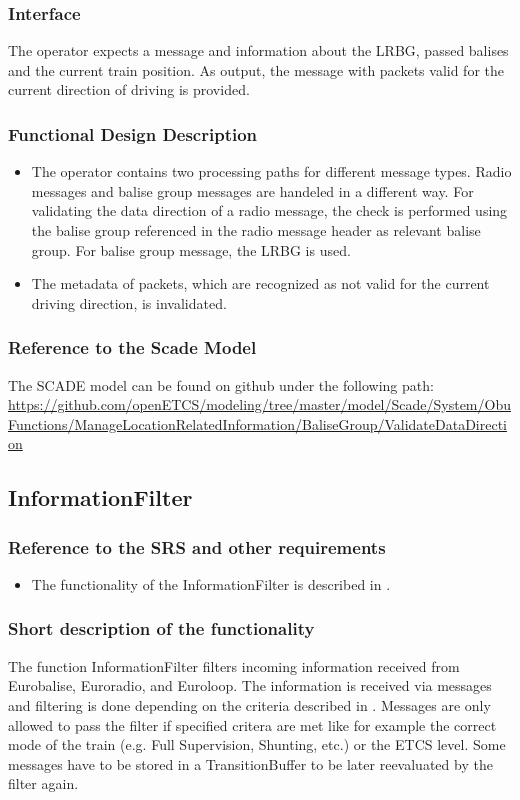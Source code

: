 \subsubsection{Interface}
The operator expects a message and information about the LRBG, passed balises and the current train position. As output, the message with packets valid for the current direction of driving is provided.

\subsubsection{Functional Design Description}
\begin{itemize}
 \item The operator contains two processing paths for different message types. Radio messages and balise group messages are handeled in a different way. For validating the data direction of a radio message, the check is performed using the balise group referenced in the radio message header as relevant balise group. For balise group message, the LRBG is used.
 \item The metadata of packets, which are recognized as not valid for the current driving direction, is invalidated.
\end{itemize}

\subsubsection{Reference to the Scade Model}
The SCADE model can be found on github under the following path: \url{https://github.com/openETCS/modeling/tree/master/model/Scade/System/ObuFunctions/ManageLocationRelatedInformation/BaliseGroup/ValidateDataDirection}

\subsection{InformationFilter}

\subsubsection{Reference to the SRS and other requirements}
\begin{itemize}
 \item The functionality of the InformationFilter is described in \cite[Chapter~4.8]{subset-026}.
\end{itemize}

\subsubsection{Short description of the functionality}
The function InformationFilter filters incoming information received
from Eurobalise, Euroradio, and Euroloop. The information is received
via messages and filtering is done depending on the criteria described
in \cite[Chapter~4.8]{subset-026}. Messages are only allowed to pass
the filter if specified critera are met like for example the correct
mode of the train (e.g. Full Supervision, Shunting, etc.) or the ETCS
level. Some messages have to be stored in a TransitionBuffer to be
later reevaluated by the filter again.


